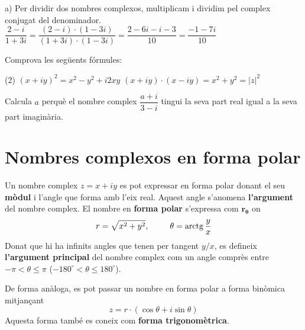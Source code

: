 \begin{example}
	a) Per dividir dos nombres complexos, multiplicam i dividim pel complex conjugat del denominador.
	$\dfrac{2-i}{1+3 i} = \dfrac{(2-i)\cdot (1-3i)}{(1+3 i)\cdot (1-3i)} = \dfrac{2-6i-i-3}{10}=\dfrac{-1-7i}{10}$
	 
\end{example}


\begin{mylist}
	
	\exer Comprova les següents fórmules:
	\begin{tasks}(2)
		\task $(x+iy)^2=x^2-y^2+i2xy$
		\task $(x+iy)\cdot (x-iy)=x^2+y^2=|z|^2$
	\end{tasks}
	

	
	\exer Calcula $a$ perquè el nombre complex $\dfrac{a+i}{3-i}$ tingui la seva part real igual a la seva part imaginària.
\end{mylist}


\section{Nombres complexos en forma polar} 




\begin{theorybox}
	
	Un nombre complex $z=x+iy$ es pot expressar en forma polar donant el seu \textbf{mòdul} i l'angle que forma amb l'eix real.
	Aquest angle s'anomena \textbf{l'argument} del nombre complex. El nombre en \textbf{forma polar} s'expressa com $\mathbf{r_\theta}$ on
	\begin{equation*}
	r=\sqrt{x^2+y^2}, \,\,\,\,\, \,\,\,\,\,\,\,\,\,\, \theta = \mathrm{arctg}\, \dfrac{y}{x}
	\end{equation*}	
	Donat que hi ha infinits angles que tenen per tangent $y/x$, es defineix \textbf{l'argument principal} del nombre complex com un angle comprès entre $-\pi < \theta \leq \pi$ \; ($-180^\circ < \theta \leq 180^\circ$).
	
	De forma anàloga, es pot passar un nombre en forma polar a forma binòmica mitjançant
	\begin{equation*}
	z = r \cdot (\cos \theta + i \sin \theta)
	\end{equation*}	
	Aquesta forma també es coneix com \textbf{forma trigonomètrica}.
	

\end{theorybox}


